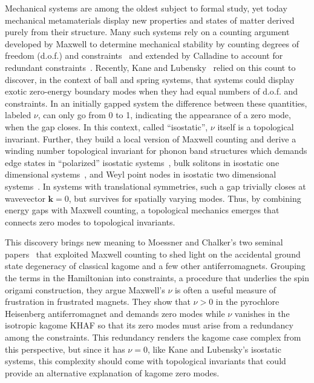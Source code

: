 \documentclass[a4paper,aps,prl,twocolumn,floatfix,showpacs,superscriptaddress]{revtex4-1}
\begin{document}
Mechanical systems are among the oldest subject to formal study, yet today mechanical metamaterials display new properties and states of matter derived purely from their structure. Many such systems rely on a counting argument developed by Maxwell to determine mechanical stability by counting degrees of freedom (d.o.f.) and constraints~\cite{maxwell1864xlv} and extended by Calladine to account for redundant constraints~\cite{calladine1978buckminster}.
Recently, Kane and Lubensky~\cite{kane2014topological} relied on this count to discover, in the context of ball and spring systems, that systems could display exotic zero-energy boundary modes when they had equal numbers of d.o.f. and constraints. In an initially gapped system the difference between these quantities, labeled $\nu$, can only go from 0 to 1, indicating the appearance of a zero mode, when the gap closes. In this context, called ``isostatic'', $\nu$ itself is a topological invariant. Further, they build a local version of Maxwell counting and derive a winding number topological invariant for phonon band structures which demands edge states in ``polarized'' isostatic systems~\cite{kane2014topological}, bulk solitons in isostatic one dimensional systems~\cite{chen2014nonlinear}, and Weyl point nodes in isostatic two dimensional systems~\cite{po2016phonon, rocklin2016mechanical}. In systems with translational symmetries, such a gap trivially closes at wavevector $\mathbf{k} = 0$, but survives for spatially varying modes. Thus, by combining energy gaps with Maxwell counting, a topological mechanics emerges that connects zero modes to topological invariants.

This discovery brings new meaning to Moessner and Chalker's two seminal papers~\cite{moessner1998properties,moessner1998low} that exploited Maxwell counting to shed light on the accidental ground state degeneracy of classical kagome and a few other antiferromagnets. Grouping the terms in the Hamiltonian into constraints, a procedure that underlies the spin origami construction, they argue Maxwell's $\nu$ is often a useful measure of frustration in frustrated magnets. They show that $\nu > 0$ in the pyrochlore Heisenberg antiferromagnet and demands zero modes while $\nu$ vanishes in the isotropic kagome KHAF so that its zero modes must arise from a redundancy among the constraints. This redundancy renders the kagome case complex from this perspective, but since it has $\nu=0$, like Kane and Lubensky's isostatic systems, this complexity should come with topological invariants that could provide an alternative explanation of kagome zero modes. 
\end{document}
